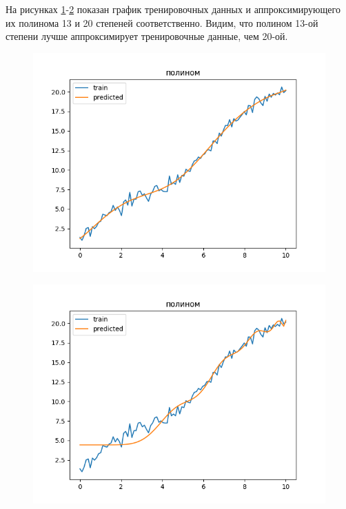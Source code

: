 \documentclass[12pt]{report}
\begin{document}
На рисунках \ref{fig:1_13}-\ref{fig:1_20} показан график тренировочных данных и аппроксимирующего их полинома 13 и 20 степеней соответственно. Видим, что полином 13-ой степени лучше аппроксимирует тренировочные данные, чем 20-ой.

 \begin{figure}[h!]
  \centering
  \includegraphics[width = \linewidth]{1_13.png}
  \caption{}
  \label{fig:1_13}
\end{figure}
\newpage

\begin{figure}[h!]
  \centering
  \includegraphics[width = \linewidth]{1_20.png}
  \caption{}
  \label{fig:1_20}
\end{figure}
\newpage
\end{document}
